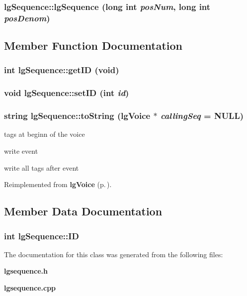 \subsubsection{\setlength{\rightskip}{0pt plus 5cm}lg\-Sequence::lg\-Sequence (long int {\em pos\-Num}, long int {\em pos\-Denom})}\label{classlgSequence_a1}




\subsection{Member Function Documentation}
\subsubsection{\setlength{\rightskip}{0pt plus 5cm}int lg\-Sequence::get\-ID (void)}\label{classlgSequence_a3}


\subsubsection{\setlength{\rightskip}{0pt plus 5cm}void lg\-Sequence::set\-ID (int {\em id})}\label{classlgSequence_a2}


\subsubsection{\setlength{\rightskip}{0pt plus 5cm}string lg\-Sequence::to\-String ({\bf lg\-Voice} $\ast$ {\em calling\-Seq} = NULL)\hspace{0.3cm}{\tt  [virtual]}}\label{classlgSequence_a0}


tags at beginn of the voice 

write event

write all tags after event 

Reimplemented from {\bf lg\-Voice} {\rm (p.\,\pageref{classlgVoice_a20})}.

\subsection{Member Data Documentation}
\subsubsection{\setlength{\rightskip}{0pt plus 5cm}int {\bf lg\-Sequence::ID}\hspace{0.3cm}{\tt  [private]}}\label{classlgSequence_r0}




The documentation for this class was generated from the following files:\begin{CompactItemize}
\item 
{\bf lgsequence.h}\item 
{\bf lgsequence.cpp}\end{CompactItemize}
